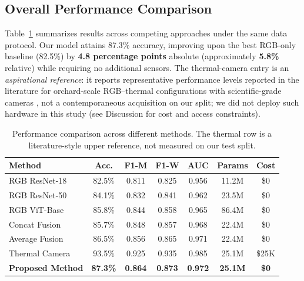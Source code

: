 \documentclass[conference]{IEEEtran}
\begin{document}
\subsection{Overall Performance Comparison}
Table~\ref{tab:performance} summarizes results across competing approaches under the same data protocol. Our model attains 87.3\% accuracy, improving upon the best RGB-only baseline (82.5\%) by \textbf{4.8 percentage points} absolute (approximately \textbf{5.8\%} relative) while requiring no additional sensors. The thermal-camera entry is an \emph{aspirational reference}: it reports representative performance levels reported in the literature for orchard-scale RGB--thermal configurations with scientific-grade cameras \cite{khanal2017,pineda2021}, not a contemporaneous acquisition on our split; we did not deploy such hardware in this study (see Discussion for cost and access constraints).

\begin{table}[!t]
    \caption{Performance comparison across different methods. The thermal row is a literature-style upper reference, not measured on our test split.}
    \label{tab:performance}
    \raggedright
    \scriptsize
    \begin{tabular}{lcccccc}
        \toprule
        \textbf{Method} & \textbf{Acc.} & \textbf{F1-M} & \textbf{F1-W} & \textbf{AUC} & \textbf{Params} & \textbf{Cost} \\
        \midrule
        RGB ResNet-18 & 82.5\% & 0.811 & 0.825 & 0.956 & 11.2M & \$0 \\
        RGB ResNet-50 & 84.1\% & 0.832 & 0.841 & 0.962 & 23.5M & \$0 \\
        RGB ViT-Base & 85.8\% & 0.844 & 0.858 & 0.965 & 86.4M & \$0 \\
        Concat Fusion & 85.7\% & 0.848 & 0.857 & 0.968 & 22.4M & \$0 \\
        Average Fusion & 86.5\% & 0.856 & 0.865 & 0.971 & 22.4M & \$0 \\
        Thermal Camera & 93.5\% & 0.925 & 0.935 & 0.985 & 25.1M & \$25K \\
        \rowcolor{green!20}
        \textbf{Proposed Method} & \textbf{87.3\%} & \textbf{0.864} & \textbf{0.873} & \textbf{0.972} & \textbf{25.1M} & \textbf{\$0} \\
        \bottomrule
    \end{tabular}
\end{table}
\end{document}
